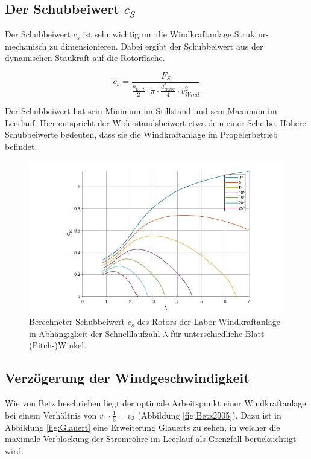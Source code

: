 \subsection{Der Schubbeiwert \texorpdfstring{$c_S$}{}}

Der Schubbeiwert $c_{s}$ ist sehr wichtig um die Windkraftanlage Struktur-mechanisch zu dimensionieren.  Dabei ergibt der Schubbeiwert aus der dynamischen Staukraft auf die Rotorfläche.

\begin{equation}
  c_{s}= \frac{F_{S}}{\frac{\rho_{Luft}}{2}\cdot \pi \cdot \frac{d^2_{Rotor}}{4} \cdot v^2_{Wind}}
    \label{eq:Schubbeiwert_cs}
\end{equation}

Der Schubbeiwert hat sein Minimum im Stillstand und sein Maximum im Leerlauf. Hier entspricht der Widerstandsbeiwert etwa dem einer Scheibe. Höhere Schubbeiwerte bedeuten, dass sie die Windkraftanlage im Propelerbetrieb befindet.\cite{Anleitung}

\begin{figure}[H]
    \centering
    \includegraphics[width=1\textwidth]{Abbildungen/cszulambda.jpg}
    \caption{Berechneter Schubbeiwert $c_{s}$ des Rotors der Labor-Windkraftanlage in Abhängigkeit der Schnelllaufzahl $\lambda$ für unterschiedliche Blatt (Pitch-)Winkel.\cite{Anleitung}}
    \label{fig:cszulambda}
  \end{figure}

\newpage
\subsection{Verzögerung der Windgeschwindigkeit}
Wie von Betz beschrieben liegt der optimale Arbeitspunkt einer Windkraftanlage bei einem Verhältnis von $v_{1} \cdot \frac{1}{3}=v_{3}$  (Abbildung \ref{fig:Betz2905}). Dazu ist in Abbildung \ref{fig:Glauert} eine Erweiterung Glauerts zu sehen, in welcher die maximale Verblockung der Stromröhre im Leerlauf als Grenzfall berücksichtigt wird.

